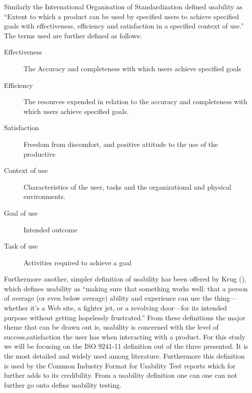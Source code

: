 \documentclass[a4paper,oneside,11pt]{report}
\begin{document}
Similarly the International Organisation of Standardization \autocite{ISO9241-11} defined usability as \enquote {Extent to which a product can be used by specified users to achieve specified goals with effectiveness, efficiency and satisfaction in a specified context of use.} 
The terms used are further defined as follows:

\begin{description}
  \item[Effectiveness] The Accuracy and completeness with which users achieve specified goals
  \item[Efficiency] The resources expended in relation to the accuracy and completeness with which users achieve specified goals.
  \item [Satisfaction] Freedom from discomfort, and positive attitude to the use of the productive
 \item [Context of use] Characteristics of the user, tasks and the organizational and physical environments.
  \item [Goal of use] Intended outcome
  \item [Task of use] Activities required to achieve a goal
\end{description}

Furthermore another, simpler definition of usability has been offered by Krug (\citeyear{krug2005}), which defines usability as \enquote {making sure that something works well: that a person of average (or even below average) ability and experience can use the 
thing—whether it’s a Web site, a fighter jet, or a revolving door—for its intended purpose without getting hopelessly frustrated.}
 From these definitions the major theme that can be drawn out is, usability is concerned with the level of success,satisfaction the user has when interacting with a product. For this study we will be focusing on the ISO 9241-11 definition out of the three presented. It is the most detailed and widely used among literature. Furthermore this definition is used by the Common Industry Format for Usability Test reports which for further adds to its credibility. 
 From a usability definition one can one can not further go onto define usability testing.
\end{document}
